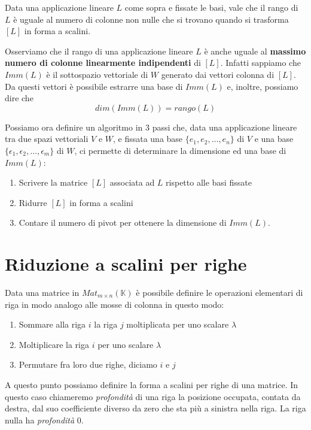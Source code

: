 \begin{theorem}
	Data una applicazione lineare $L$ come sopra e fissate le basi, vale che
	il rango di $L$ \`e uguale al numero di colonne non nulle che si trovano
	quando si trasforma $[L]$ in forma a scalini.
\end{theorem}

\begin{observation}
	Osserviamo che il rango di una applicazione lineare $L$ \`e anche uguale al
	\textbf{massimo numero di colonne linearmente indipendenti} di $[L]$.
	Infatti sappiamo che $Imm(L)$ \`e il sottospazio vettoriale di $W$ generato
	dai vettori colonna di $[L]$. Da questi vettori \`e possibile estrarre una
	base di $Imm(L)$ e, inoltre, possiamo dire che \[dim(Imm(L)) = rango (L)\]
\end{observation}

\begin{observation}
	Possiamo ora definire un algoritmo in 3 passi che, data una
	applicazione lineare tra due spazi vettoriali $V$ e $W$, e fissata una base
	$\{e_1, e_2, \dots, e_n\}$ di $V$ e una base
	$\{\epsilon_1, \epsilon_2, \dots, \epsilon_m\}$ di $W$, ci permette di
	determinare la dimensione ed una base di $Imm(L)$:
	\begin{enumerate}
		\item Scrivere la matrice $[L]$ associata ad $L$ rispetto alle basi
		      fissate
		\item Ridurre $[L]$ in forma a scalini
		\item Contare il numero di pivot per ottenere la dimensione di $Imm(L)$.
	\end{enumerate}
\end{observation}

\section{Riduzione a scalini per righe}
Data una matrice in $Mat_{m \times n}(\mathbb{K})$ \`e possibile definire le
operazioni elementari di riga in modo analogo alle mosse di colonna in questo
modo:
\begin{enumerate}
	\item Sommare alla riga $i$ la riga $j$ moltiplicata per uno scalare $\lambda$
	\item Moltiplicare la riga $i$ per uno scalare $\lambda$
	\item Permutare fra loro due righe, diciamo $i$ e $j$
\end{enumerate}
A questo punto possiamo definire la forma a scalini per righe di una matrice.
In questo caso chiameremo \emph{profondit\`a} di una riga la posizione occupata,
contata da destra, dal suo coefficiente diverso da zero che sta pi\`u a sinistra
nella riga. La riga nulla ha \emph{profondit\`a} 0.


